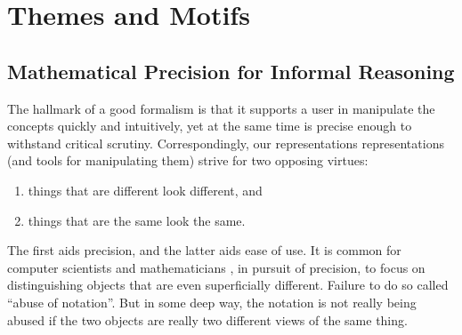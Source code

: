 \section{Themes and Motifs}



\subsection{Mathematical Precision for Informal Reasoning}

%
The hallmark of a good formalism is that it supports a user in manipulate the concepts quickly and intuitively, yet at the same time is precise enough to withstand critical scrutiny.
%
Correspondingly, our representations representations (and tools for manipulating them)
    strive for two opposing virtues:
\begin{enumerate}[nosep]
    \item things that are different look different, and
    \item things that are the same look the same. 
\end{enumerate}
The first aids precision, and the latter aids ease of use. 
It is common for computer scientists and mathematicians 
    \unskip,
    in pursuit of precision,
    to focus on distinguishing objects that are even superficially different.  
Failure to do so called ``abuse of notation''. 
%
But in some deep way, the notation is not really being abused if the two objects are really two different views of the same thing.

